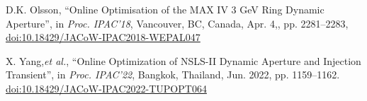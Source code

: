\documentclass[a4paper,
               keeplastbox,   %
               ]{jacow}
\begin{document}
\begin{thebibliography}{9}
       D.K. Olsson,
       \textquotedblleft{Online Optimisation of the MAX IV 3 GeV Ring Dynamic Aperture}\textquotedblright,
       in \emph{Proc. IPAC'18}, Vancouver, BC, Canada, Apr. 4,, pp. 2281--2283,
       \url{doi:10.18429/JACoW-IPAC2018-WEPAL047}
    
        X. Yang,\emph{et al.},
       \textquotedblleft{Online Optimization of NSLS-II Dynamic Aperture and Injection Transient}\textquotedblright,
        in \emph{Proc. IPAC'22}, Bangkok, Thailand, Jun. 2022, pp. 1159--1162.
       \url{doi:10.18429/JACoW-IPAC2022-TUPOPT064}
    
   
	\end{thebibliography}

%
% 

%
\end{document}
